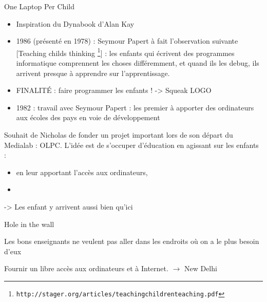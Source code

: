 \begin{frame}{One Laptop Per Child}
  \begin{itemize}
   \item Inspiration du Dynabook d'Alan Kay
   \item 1986 (présenté en 1978) : Seymour Papert à fait l'observation suivante [Teaching childs thinking \footnote{\texttt{http://stager.org/articles/teachingchildrenteaching.pdf}}] : les enfants qui écrivent des programmes informatique comprennent les choses différemment, et quand ils les debug, ils arrivent presque à apprendre sur l'apprentissage.
   \item FINALITÉ : faire programmer les enfants ! -> Squeak LOGO 
   \item 1982 : travail avec Seymour Papert : les premier à apporter des ordinateurs aux écoles des pays en voie de développement
  \end{itemize}
  Souhait de Nicholas de fonder un projet important lors de son départ du Medialab : OLPC. L'idée est de s'occuper d'éducation en agissant sur les enfants :
  \begin{itemize}
  \item en leur apportant l'accès aux ordinateurs,
  \item 
  \end{itemize}
  -> Les enfant y arrivent aussi bien qu'ici
\end{frame}

\begin{frame}
    \pause
    \begin{block}{Hole in the wall}
    \begin{coolquote}
    Les bons enseignants ne veulent pas aller dans les endroits où on a le plus besoin d'eux
    \end{coolquote}
    
      Fournir un libre accès aux ordinateurs et à Internet.
       $\rightarrow$ New Delhi
    \end{block}
\end{frame}

